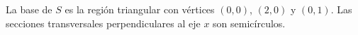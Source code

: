 \item La base de $S$ es la región triangular con vértices $(0, 0)$, $(2, 0)$ y $(0, 1)$. Las secciones transversales perpendiculares al eje $x$ son semicírculos.
